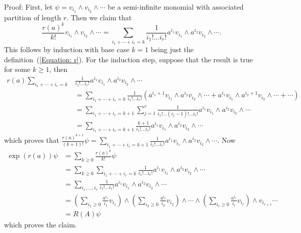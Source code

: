 Proof: First, let $\psi = v_{i_1}\wedge v_{i_2}\wedge \cdots$ be a semi-infinite monomial with associated partition of length $r$. Then we claim that
\begin{equation}
    \frac{r(a)^k}{k!} v_{i_1}\wedge v_{i_2}\wedge \cdots = \sum_{i_1+\cdots+i_r=k}\frac{1}{i_1!\dots i_r!} a^{i_1}v_{i_1}\wedge a^{i_2}v_{i_2}\wedge \cdots.
\end{equation}
This follows by induction with base case $k=1$ being just the definition~(\ref{Equation: r}). For the induction step, suppose that the result is true for some $k\geq1$, then
\begin{equation}
    \begin{split}
        r(a)\sum_{i_1+\cdots+i_r=k}&\frac{1}{i_1!\dots i_r!} a^{i_1}v_{i_1}\wedge a^{i_2}v_{i_2}\wedge \cdots\\
        &=\sum_{i_1+\cdots+i_r=k}\frac{1}{i_1!\dots i_r!}(a^{i_1+1}v_{i_1}\wedge a^{i_2}v_{i_2}\wedge \cdots+a^{i_1}v_{i_1}\wedge a^{i_2+1}v_{i_2}\wedge \cdots+\cdots)\\
        &=\sum_{i_1+\cdots +i_r=k+1}\sum_{j=1}^r\frac{1}{i_1!\dots (i_j-1)!\dots i_r!}a^{i_1}v_{i_1}\wedge a^{i_2}v_{i_2}\wedge\cdots\\
        &=\sum_{i_1+\cdots +i_r=k+1}\frac{k+1}{i_1!\dots i_r!}a^{i_1}v_{i_1}\wedge a^{i_2}v_{i_2}\wedge\cdots
    \end{split}
\end{equation}
which proves that $\frac{r(a)^{k+1}}{(k+1)!}\psi = \sum_{i_1+\cdots +i_r=k+1}\frac{1}{i_1!\dots i_r!}a^{i_1}v_{i_1}\wedge a^{i_2}v_{i_2}\wedge\cdots$. Now
\begin{equation}
    \begin{split}
        \exp(r(a))\psi &= \sum_{k\geq0} \frac{r(a)^{k}}{k!}\psi\\
        &=\sum_{k\geq0}\sum_{i_1+\cdots +i_r=k}\frac{1}{i_1!\dots i_r!}a^{i_1}v_{i_1}\wedge a^{i_2}v_{i_2}\wedge\cdots\\
        &=\sum_{i_1,\dots,i_r}\frac{1}{i_1!\dots i_r!}a^{i_1}v_{i_1}\wedge a^{i_2}v_{i_2}\wedge\cdots\\
        &=\left(\sum_{i_1\geq0}\frac{a^{i_1}}{i_1}v_{i_1}\right)\wedge\left(\sum_{i_2\geq0}\frac{a^{i_2}}{i_2}v_{i_2}\right)\wedge\cdots \wedge \left(\sum_{i_r\geq0}\frac{a^{i_r}}{i_r}v_{i_r}\right)\wedge v_{i_{r+1}}\cdots \\
        &=R(A)\psi
    \end{split}
\end{equation}
which proves the claim.\par

